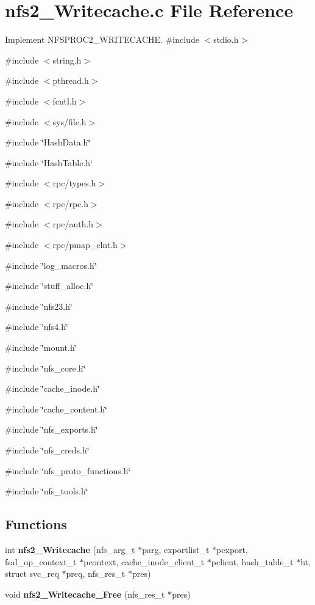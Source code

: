 \section{nfs2\_\-Writecache.c File Reference}
\label{nfs2__Writecache_8c}


Implement NFSPROC2\_\-WRITECACHE.  
{\ttfamily \#include $<$stdio.h$>$}\par
{\ttfamily \#include $<$string.h$>$}\par
{\ttfamily \#include $<$pthread.h$>$}\par
{\ttfamily \#include $<$fcntl.h$>$}\par
{\ttfamily \#include $<$sys/file.h$>$}\par
{\ttfamily \#include \char`\"{}HashData.h\char`\"{}}\par
{\ttfamily \#include \char`\"{}HashTable.h\char`\"{}}\par
{\ttfamily \#include $<$rpc/types.h$>$}\par
{\ttfamily \#include $<$rpc/rpc.h$>$}\par
{\ttfamily \#include $<$rpc/auth.h$>$}\par
{\ttfamily \#include $<$rpc/pmap\_\-clnt.h$>$}\par
{\ttfamily \#include \char`\"{}log\_\-macros.h\char`\"{}}\par
{\ttfamily \#include \char`\"{}stuff\_\-alloc.h\char`\"{}}\par
{\ttfamily \#include \char`\"{}nfs23.h\char`\"{}}\par
{\ttfamily \#include \char`\"{}nfs4.h\char`\"{}}\par
{\ttfamily \#include \char`\"{}mount.h\char`\"{}}\par
{\ttfamily \#include \char`\"{}nfs\_\-core.h\char`\"{}}\par
{\ttfamily \#include \char`\"{}cache\_\-inode.h\char`\"{}}\par
{\ttfamily \#include \char`\"{}cache\_\-content.h\char`\"{}}\par
{\ttfamily \#include \char`\"{}nfs\_\-exports.h\char`\"{}}\par
{\ttfamily \#include \char`\"{}nfs\_\-creds.h\char`\"{}}\par
{\ttfamily \#include \char`\"{}nfs\_\-proto\_\-functions.h\char`\"{}}\par
{\ttfamily \#include \char`\"{}nfs\_\-tools.h\char`\"{}}\par
\subsection*{Functions}
\begin{DoxyCompactItemize}
\item 
int {\bf nfs2\_\-Writecache} (nfs\_\-arg\_\-t $\ast$parg, exportlist\_\-t $\ast$pexport, fsal\_\-op\_\-context\_\-t $\ast$pcontext, cache\_\-inode\_\-client\_\-t $\ast$pclient, hash\_\-table\_\-t $\ast$ht, struct svc\_\-req $\ast$preq, nfs\_\-res\_\-t $\ast$pres)
\item 
void {\bf nfs2\_\-Writecache\_\-Free} (nfs\_\-res\_\-t $\ast$pres)
\end{DoxyCompactItemize}


